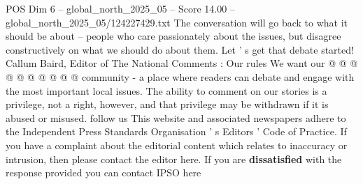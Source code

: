 \begin{textsample}{POS Dim 6 – global\_north\_2025\_05 – Score 14.00 – global\_north\_2025\_05/124227429.txt}
The conversation will go back to what it should be about -- people who care passionately about the issues, but disagree constructively on what we should do about them.
Let ' s get that debate started!
Callum Baird, Editor of The National Comments : Our rules We want our @ @ @ @ @ @ @ @ @ @ community - a place where readers can debate and engage with the most important local issues.
The ability to comment on our stories is a privilege, not a right, however, and that privilege may be withdrawn if it is abused or misused. follow us This website and associated newspapers adhere to the Independent Press Standards Organisation ' s Editors ' Code of Practice.
If you have a complaint about the editorial content which relates to inaccuracy or intrusion, then please contact the editor here.
If you are \textbf{dissatisfied} with the response provided you can contact IPSO here

\end{textsample}

